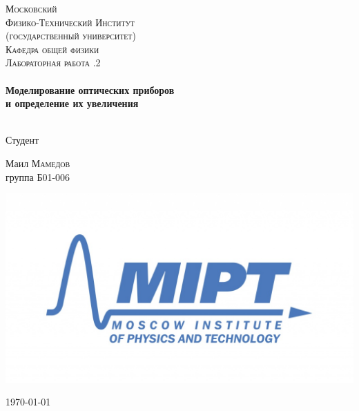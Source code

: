 \begin{titlepage}
\center %
 

\textsc{\LARGE Московский\\[-0.2cm]Физико-Технический Институт\\[0.1cm]\large (государственный университет)}\\[1.5cm] %
\textsc{\Large Кафедра общей физики}\\[0.1cm] %
\textsc{\large Лабораторная работа .2}\\[0.5cm] %


\HRule
\\[0.4cm]
{ \huge \bfseries Моделирование оптических приборов\\[0.2cm]
и определение их увеличения}
\\[0.6cm] %
\HRule
\\[1.5cm]


 

	\begin{flushleft} \large
		\textsf{Студент}
		
		Маил \textsc{Мамедов} \\[-0.15cm]
		 группа Б01-006
	\end{flushleft}


\begin{bottompar}
	\begin{center}
		\includegraphics[width = 80 mm]{logo.jpg}
	\end{center}
	{\large \today}

\end{bottompar}
\vfill %

\end{titlepage}